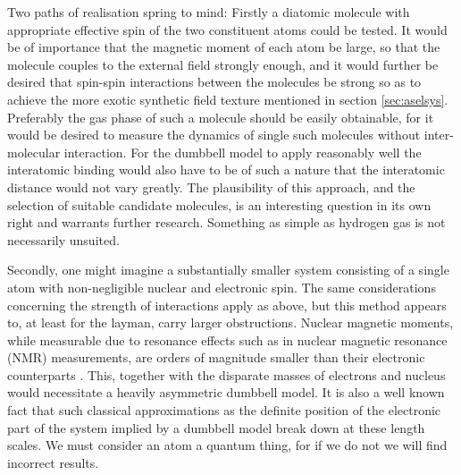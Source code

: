 \documentclass[main.tex]{subfiles}
\begin{document}
Two paths of realisation spring to mind: Firstly a diatomic molecule with appropriate effective
spin of the two constituent atoms could be tested. It would be of importance that the
magnetic moment of each atom be large, so that the molecule couples to the external
field strongly enough, and it would further be desired that spin-spin interactions
between the molecules be strong so as to achieve the more exotic synthetic field texture
mentioned in section \ref{sec:aselsys}. Preferably the gas phase of such a molecule should
be easily obtainable, for it would be desired to measure the dynamics of single such
molecules without inter-molecular interaction. For the dumbbell model to apply reasonably
well the interatomic binding would also have to be of such a nature that the interatomic
distance would not vary greatly. The plausibility of this approach, and the selection of
suitable candidate molecules, is an interesting question in its own right and warrants
further research. Something as simple as hydrogen gas is not necessarily unsuited.

Secondly, one might imagine a substantially smaller system consisting of a single atom with
non-negligible nuclear and electronic spin. The same considerations concerning the strength
of interactions apply as above, but this method appears to, at least for the layman, carry
larger obstructions. Nuclear magnetic moments, while measurable due to resonance effects such as in
nuclear magnetic resonance (NMR) measurements, are orders of magnitude smaller than their
electronic counterparts \cite{krane}. This, together with the disparate masses of electrons
and nucleus would necessitate a heavily asymmetric dumbbell model. It is also a well known
fact that such classical approximations as the definite position of the electronic part of
the system implied by a dumbbell model break down at these length scales. We must consider
an atom a quantum thing, for if we do not we will find incorrect results.
\end{document}
